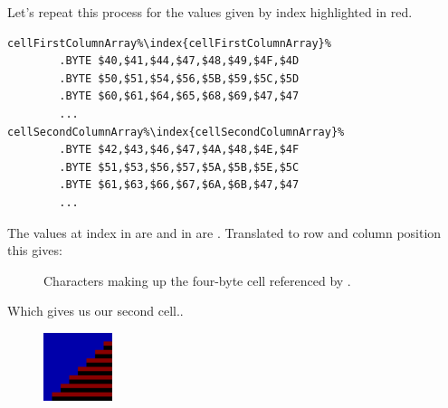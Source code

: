 Let's repeat this process for the values given by index  highlighted in red. 

\begin{lstlisting}[escapechar=\%]
cellFirstColumnArray%\index{cellFirstColumnArray}%
        .BYTE $40,$41,$44,$47,$48,$49,$4F,$4D
        .BYTE $50,$51,$54,$56,$5B,$59,$5C,$5D
        .BYTE $60,$61,$64,$65,$68,$69,$47,$47
        ...
cellSecondColumnArray%\index{cellSecondColumnArray}%   
        .BYTE $42,$43,$46,$47,$4A,$48,$4E,$4F
        .BYTE $51,$53,$56,$57,$5A,$5B,$5E,$5C
        .BYTE $61,$63,$66,$67,$6A,$6B,$47,$47
        ...
\end{lstlisting}

The values at index  in  are  and
in  are . Translated to row and column position
this gives:

\begin{figure}[H]                          
{                                          
  \setlength{\tabcolsep}{3.0pt}            
  \setlength\cmidrulewidth{\lightrulewidth}
    \begin{adjustbox}{width=5cm,center}
\begin{subfigure}{0.12\textwidth}

\end{subfigure}
\begin{subfigure}{0.12\textwidth}

\end{subfigure}
    \end{adjustbox}
    \begin{adjustbox}{width=5cm,center}
\begin{subfigure}{0.12\textwidth}

\end{subfigure}
\begin{subfigure}{0.12\textwidth}

\end{subfigure}
    \end{adjustbox}
  }\caption[]{Characters making up the four-byte cell referenced by .}
\end{figure}

Which gives us our second cell..
\begin{figure}[H]
  {
    \begin{adjustbox}{width=2cm,center}
        \includegraphics[width=2cm]{src/bonusphase/row21_cell1.png}%
    \end{adjustbox}
  }
\end{figure}

